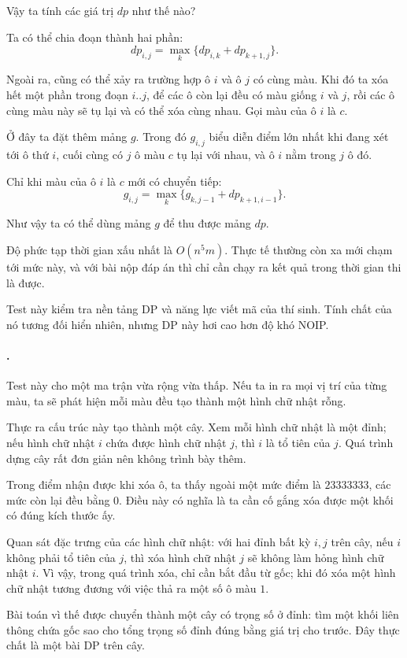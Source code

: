 \documentclass[11pt]{article}
\begin{document}
Vậy ta tính các giá trị \(dp\) như thế nào?

Ta có thể chia đoạn thành hai phần:
\[
  dp_{i,j}=\max_k\{dp_{i,k}+dp_{k+1,j}\}.
\]

Ngoài ra, cũng có thể xảy ra trường hợp ô \(i\) và ô \(j\) có cùng màu. Khi
đó ta xóa hết một phần trong đoạn \(i..j\), để các ô còn lại đều có màu giống
\(i\) và \(j\), rồi các ô cùng màu này sẽ tụ lại và có thể xóa cùng nhau. Gọi
màu của ô \(i\) là \(c\).

Ở đây ta đặt thêm mảng \(g\). Trong đó \(g_{i,j}\) biểu diễn điểm lớn nhất khi
đang xét tới ô thứ \(i\), cuối cùng có \(j\) ô màu \(c\) tụ lại với nhau, và ô
\(i\) nằm trong \(j\) ô đó.

Chỉ khi màu của ô \(i\) là \(c\) mới có chuyển tiếp:
\[
  g_{i,j}=\max_k\{g_{k,j-1}+dp_{k+1,i-1}\}.
\]

Như vậy ta có thể dùng mảng \(g\) để thu được mảng \(dp\).

Độ phức tạp thời gian xấu nhất là \(O(n^5m)\). Thực tế thường còn xa mới chạm
tới mức này, và với bài nộp đáp án thì chỉ cần chạy ra kết quả trong thời gian
thi là được.

Test này kiểm tra nền tảng DP và năng lực viết mã của thí sinh. Tính chất của
nó tương đối hiển nhiên, nhưng DP này hơi cao hơn độ khó NOIP.

\paragraph{.}
Test này cho một ma trận vừa rộng vừa thấp. Nếu ta in ra mọi vị trí của từng
màu, ta sẽ phát hiện mỗi màu đều tạo thành một hình chữ nhật rỗng.

Thực ra cấu trúc này tạo thành một cây. Xem mỗi hình chữ nhật là một đỉnh; nếu
hình chữ nhật \(i\) chứa được hình chữ nhật \(j\), thì \(i\) là tổ tiên của
\(j\). Quá trình dựng cây rất đơn giản nên không trình bày thêm.

Trong điểm nhận được khi xóa ô, ta thấy ngoài một mức điểm là \(23333333\), các
mức còn lại đều bằng \(0\). Điều này có nghĩa là ta cần cố gắng xóa được một
khối có đúng kích thước ấy.

Quan sát đặc trưng của các hình chữ nhật: với hai đỉnh bất kỳ \(i,j\) trên
cây, nếu \(i\) không phải tổ tiên của \(j\), thì xóa hình chữ nhật \(j\) sẽ
không làm hỏng hình chữ nhật \(i\). Vì vậy, trong quá trình xóa, chỉ cần bắt
đầu từ gốc; khi đó xóa một hình chữ nhật tương đương với việc thả ra một số ô
màu \(1\).

Bài toán vì thế được chuyển thành một cây có trọng số ở đỉnh: tìm một khối
liên thông chứa gốc sao cho tổng trọng số đỉnh đúng bằng giá trị cho trước.
Đây thực chất là một bài DP trên cây.
\end{document}
